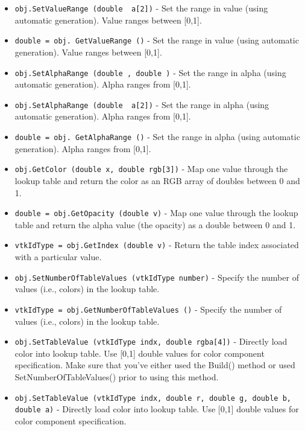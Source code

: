 \begin{itemize}
\item  \verb|obj.SetValueRange (double  a[2])| -  Set the range in value (using automatic generation). Value ranges 
 between [0,1].

\item  \verb|double = obj. GetValueRange ()| -  Set the range in value (using automatic generation). Value ranges 
 between [0,1].

\item  \verb|obj.SetAlphaRange (double , double )| -  Set the range in alpha (using automatic generation). Alpha ranges from 
 [0,1].

\item  \verb|obj.SetAlphaRange (double  a[2])| -  Set the range in alpha (using automatic generation). Alpha ranges from 
 [0,1].

\item  \verb|double = obj. GetAlphaRange ()| -  Set the range in alpha (using automatic generation). Alpha ranges from 
 [0,1].

\item  \verb|obj.GetColor (double x, double rgb[3])| -  Map one value through the lookup table and return the color as
 an RGB array of doubles between 0 and 1.

\item  \verb|double = obj.GetOpacity (double v)| -  Map one value through the lookup table and return the alpha value
 (the opacity) as a double between 0 and 1.

\item  \verb|vtkIdType = obj.GetIndex (double v)| -  Return the table index associated with a particular value.

\item  \verb|obj.SetNumberOfTableValues (vtkIdType number)| -  Specify the number of values (i.e., colors) in the lookup
 table.

\item  \verb|vtkIdType = obj.GetNumberOfTableValues ()| -  Specify the number of values (i.e., colors) in the lookup
 table.

\item  \verb|obj.SetTableValue (vtkIdType indx, double rgba[4])| -  Directly load color into lookup table. Use [0,1] double values for color
 component specification. Make sure that you've either used the
 Build() method or used SetNumberOfTableValues() prior to using this
 method.

\item  \verb|obj.SetTableValue (vtkIdType indx, double r, double g, double b, double a)| -  Directly load color into lookup table. Use [0,1] double values for color 
 component specification.


\end{itemize}
